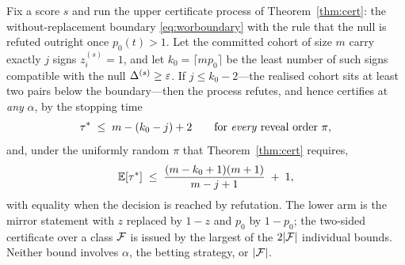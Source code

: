 \begin{theorem}\label{thm:cohortpower}
Fix a score $s$ and run the upper certificate process of
Theorem~\ref{thm:cert}: the without-replacement boundary
\eqref{eq:worboundary} with the rule that the null is refuted outright once
$p_0(t) > 1$. Let the committed cohort of size $m$ carry exactly $j$ signs
$z_i^{(s)} = 1$, and let $k_0 = \lceil m p_0 \rceil$ be the least number of
such signs compatible with the null $\Delta^{(s)} \ge \varepsilon$. If
$j \le k_0 - 2$---the realised cohort sits at least two pairs below the
boundary---then the process refutes, and hence certifies at \emph{any}
$\alpha$, by the stopping time
\begin{equation}\label{eq:cohortworst}
\tau^\ast \;\le\; m - (k_0 - j) + 2
\qquad\text{for \emph{every} reveal order } \pi,
\end{equation}
and, under the uniformly random $\pi$ that Theorem~\ref{thm:cert} requires,
\begin{equation}\label{eq:cohortmean}
\mathbb{E}[\tau^\ast] \;\le\; \frac{(m - k_0 + 1)(m+1)}{m - j + 1} \;+\; 1 ,
\end{equation}
with equality when the decision is reached by refutation. The lower arm is
the mirror statement with $z$ replaced by $1-z$ and $p_0$ by $1-p_0$; the
two-sided certificate over a class $\mathcal{F}$ is issued by the largest of the
$2|\mathcal{F}|$ individual bounds. Neither bound involves $\alpha$, the betting
strategy, or $|\mathcal{F}|$.
\end{theorem}

